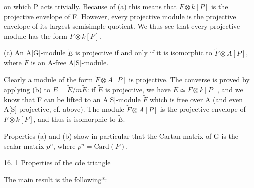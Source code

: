 on which P acts trivially. Because of (a) this means that $F \otimes k[P]$ is the projective envelope of F. However, every projective module is the projective envelope of its largest semisimple quotient. We thus see that every projective module has the form $F \otimes k[P]$.

(c) An A[G]-module $\tilde{E}$ is projective if and only if it is isomorphic to $\tilde{F} \otimes A[P]$, where $\tilde{F}$ is an A-free A[S]-module.

Clearly a module of the form $\tilde{F} \otimes A[P]$ is projective. The converse is proved by applying (b) to $E = \tilde{E}/m\tilde{E}$: if $\tilde{E}$ is projective, we have $E \simeq F \otimes k[P]$, and we know that F can be lifted to an A[S]-module $\tilde{F}$ which is free over A (and even A[S]-projective, cf. above). The module $\tilde{F} \otimes A[P]$ is the projective envelope of $F \otimes k[P]$, and thus is isomorphic to $\tilde{E}$.

Properties (a) and (b) show in particular that the Cartan matrix of G is the scalar matrix $p^n$, where $p^n = \text{Card}(P)$.

16. 1 Properties of the cde triangle

The main result is the following*:
